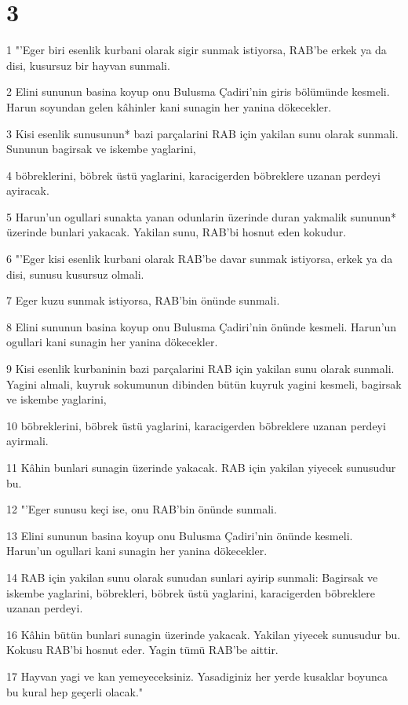 \chapter{3}

\par 1 "'Eger biri esenlik kurbani olarak sigir sunmak istiyorsa, RAB'be erkek ya da disi, kusursuz bir hayvan sunmali.
\par 2 Elini sununun basina koyup onu Bulusma Çadiri'nin giris bölümünde kesmeli. Harun soyundan gelen kâhinler kani sunagin her yanina dökecekler.
\par 3 Kisi esenlik sunusunun* bazi parçalarini RAB için yakilan sunu olarak sunmali. Sununun bagirsak ve iskembe yaglarini,
\par 4 böbreklerini, böbrek üstü yaglarini, karacigerden böbreklere uzanan perdeyi ayiracak.
\par 5 Harun'un ogullari sunakta yanan odunlarin üzerinde duran yakmalik sununun* üzerinde bunlari yakacak. Yakilan sunu, RAB'bi hosnut eden kokudur.
\par 6 "'Eger kisi esenlik kurbani olarak RAB'be davar sunmak istiyorsa, erkek ya da disi, sunusu kusursuz olmali.
\par 7 Eger kuzu sunmak istiyorsa, RAB'bin önünde sunmali.
\par 8 Elini sununun basina koyup onu Bulusma Çadiri'nin önünde kesmeli. Harun'un ogullari kani sunagin her yanina dökecekler.
\par 9 Kisi esenlik kurbaninin bazi parçalarini RAB için yakilan sunu olarak sunmali. Yagini almali, kuyruk sokumunun dibinden bütün kuyruk yagini kesmeli, bagirsak ve iskembe yaglarini,
\par 10 böbreklerini, böbrek üstü yaglarini, karacigerden böbreklere uzanan perdeyi ayirmali.
\par 11 Kâhin bunlari sunagin üzerinde yakacak. RAB için yakilan yiyecek sunusudur bu.
\par 12 "'Eger sunusu keçi ise, onu RAB'bin önünde sunmali.
\par 13 Elini sununun basina koyup onu Bulusma Çadiri'nin önünde kesmeli. Harun'un ogullari kani sunagin her yanina dökecekler.
\par 14 RAB için yakilan sunu olarak sunudan sunlari ayirip sunmali: Bagirsak ve iskembe yaglarini, böbrekleri, böbrek üstü yaglarini, karacigerden böbreklere uzanan perdeyi.
\par 16 Kâhin bütün bunlari sunagin üzerinde yakacak. Yakilan yiyecek sunusudur bu. Kokusu RAB'bi hosnut eder. Yagin tümü RAB'be aittir.
\par 17 Hayvan yagi ve kan yemeyeceksiniz. Yasadiginiz her yerde kusaklar boyunca bu kural hep geçerli olacak."

